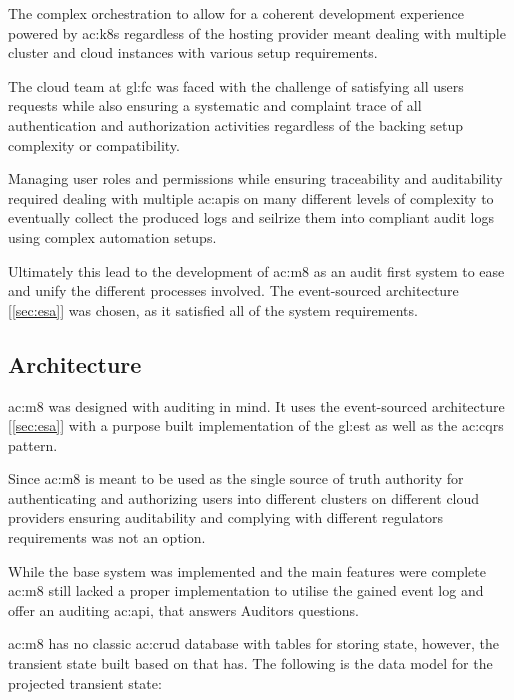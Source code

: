 The complex orchestration to allow for a coherent development experience powered by \gls{ac:k8s} regardless of the hosting provider meant dealing with multiple cluster and cloud instances with various setup requirements.

The cloud team at \gls{gl:fc} was faced with the challenge of satisfying all users requests while also ensuring a systematic and complaint trace of all authentication and authorization activities regardless of the backing setup complexity or compatibility.

Managing user roles and permissions while ensuring traceability and auditability required dealing with multiple \glspl{ac:api} on many different levels of complexity to eventually collect the produced logs and seilrize them into compliant audit logs using complex automation setups.

Ultimately this lead to the development of \gls{ac:m8} as an audit first system to ease and unify the different processes involved. The event-sourced architecture [\ref{sec:esa}] was chosen, as it satisfied all of the system requirements.

\pagebreak

\subsection{Architecture}

\Gls{ac:m8} was designed with auditing in mind. It uses the event-sourced architecture [\ref{sec:esa}] with a purpose built implementation of the \gls{gl:est} as well as the \gls{ac:cqrs} pattern.

Since \gls{ac:m8} is meant to be used as the single source of truth authority for authenticating and authorizing users into different clusters on different cloud providers ensuring auditability and complying with different regulators requirements was not an option.

While the base system was implemented and the main features were complete \gls{ac:m8} still lacked a proper implementation to utilise the gained event log and offer an auditing \gls{ac:api}, that answers Auditors questions.

\Gls{ac:m8} has no classic \acrshort{ac:crud} database with tables for storing state, however, the transient state built based on that has. The following is the data model for the projected transient state:


